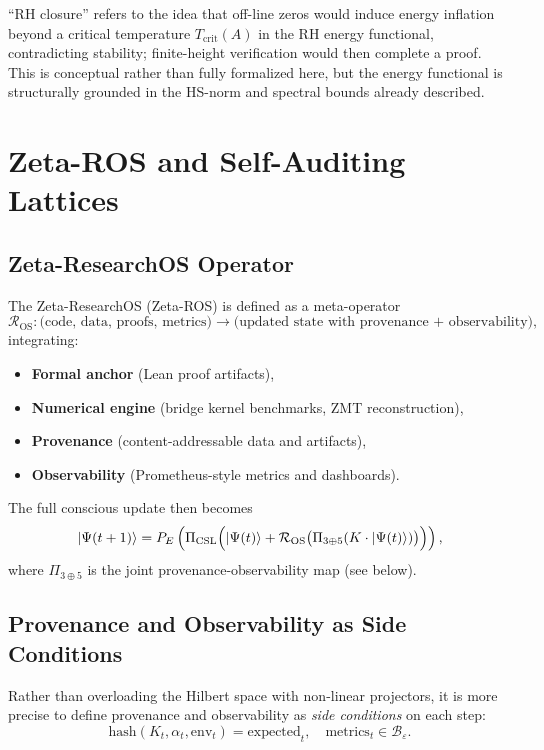 \documentclass[11pt]{article}
\begin{document}
``RH closure'' refers to the idea that off-line zeros would induce energy inflation beyond a critical temperature $T_{\text{crit}}(A)$ in the RH energy functional, contradicting stability; finite-height verification would then complete a proof. This is conceptual rather than fully formalized here, but the energy functional is structurally grounded in the HS-norm and spectral bounds already described.

\section{Zeta-ROS and Self-Auditing Lattices}

\subsection{Zeta-ResearchOS Operator}

The Zeta-ResearchOS (Zeta-ROS) is defined as a meta-operator
\[
\mathcal{R}_{\text{OS}}:
  \text{(code, data, proofs, metrics)}
  \longrightarrow
  \text{(updated state with provenance + observability)},
\]
integrating:

\begin{itemize}[leftmargin=*]
  \item \textbf{Formal anchor} (Lean proof artifacts),
  \item \textbf{Numerical engine} (bridge kernel benchmarks, ZMT reconstruction),
  \item \textbf{Provenance} (content-addressable data and artifacts),
  \item \textbf{Observability} (Prometheus-style metrics and dashboards).
\end{itemize}

The full conscious update then becomes
\[
|\Psi(t+1)\rangle =
P_E\left(
  \Pi_{\mathrm{CSL}}
    \Bigl(
      |\Psi(t)\rangle
      + \mathcal{R}_{\text{OS}}\bigl(
          \Pi_{3\oplus5}(K\cdot|\Psi(t)\rangle)
        \bigr)
    \Bigr)
\right),
\]
where $\Pi_{3\oplus5}$ is the joint provenance-observability map (see below).

\subsection{Provenance and Observability as Side Conditions}

Rather than overloading the Hilbert space with non-linear projectors, it is more precise to define provenance and observability as \emph{side conditions} on each step:
\[
\mathrm{hash}(K_t,\alpha_t,\mathrm{env}_t) = \mathrm{expected}_t,
\quad
\mathrm{metrics}_t \in \mathcal{B}_\varepsilon.
\]
\end{document}

